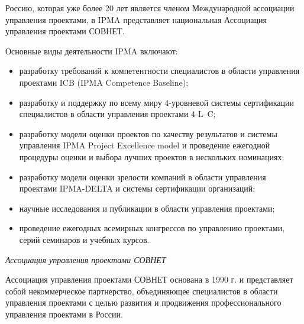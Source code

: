 Россию, которая уже более 20 лет является членом Международной ассоциации управления проектами, в IPMA представляет национальная Ассоциация управления проектами СОВНЕТ.

Основные виды деятельности IPMA включают:
\begin{itemize}
	\item разработку требований к компетентности специалистов в области управления проектами ICB (IPMA Competence Baseline);
	\item разработку и поддержку по всему миру 4-уровневой системы сертификации специалистов в области управления проектами 4-L–C;
	\item разработку модели оценки проектов по качеству результатов и системы управления IPMA Project Excellence model и проведение ежегодной процедуры оценки и выбора лучших проектов в нескольких номинациях;
	\item разработку модели оценки зрелости компаний в области управления проектами IPMA-DELTA и системы сертификации организаций;
	\item научные исследования и публикации в области управления проектами;
	\item проведение ежегодных всемирных конгрессов по управлению проектами, серий семинаров и учебных курсов.
\end{itemize}

\textit{Ассоциация управления проектами СОВНЕТ}

Ассоциация управления проектами СОВНЕТ основана в 1990 г. и представляет собой некоммерческое партнерство, объединяющее специалистов в области управления проектами с целью развития и продвижения профессионального управления проектами в России.

